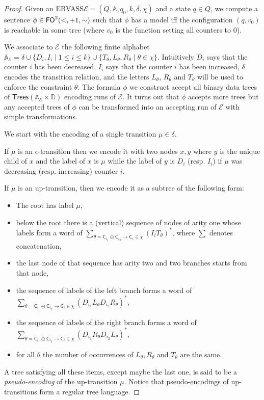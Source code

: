 \documentclass{CSML}
\newcommand\ebvass{\textup{EBVASS}\xspace}
\newcommand\A{\ensuremath{\mathbb{A}}\xspace}
\newcommand\D{\mathbb{D}}
\newcommand\Ea{\mathcal{E}}
\newcommand\merc[3]{\mathsf{C}_{#1}\mathpunct{\circleddash}\mathsf{C}_{#2}\to\mathsf{C}_{#3}}
\newcommand\Trees{\mathsf{Trees}}
\begin{document}
\begin{proof}
Given an \ebvass $\Ea=(Q,\A,q_0,k,\delta,\chi)$ and a state $q\in Q$, 
we compute a sentence $\phi \in \mathsf{FO}^2(\mathord{<},\mathord{+}1,\mathord{\sim})$ such that $\phi$ has a model 
iff the configuration $(q,v_0)$ is reachable in some tree
(where $v_0$ is the function setting all counters to $0$).

\noindent
We associate to $\Ea$ the following finite alphabet
$\A_\Ea = \delta \cup\{ D_i, I_i \mid 1\leq i \leq k\} 
               \cup \{ T_\theta, L_\theta, R_\theta \mid \theta \in \chi \}$. 
Intuitively $D_i$ says that the counter
$i$ has been decreased, $I_i$ says that the counter $i$ has been increased,
$\delta$ encodes the transition relation, and the letters $L_\theta$, $R_\theta$ and $T_\theta$ will be used to enforce 
the constraint $\theta$. 
The formula $\phi$ we construct accept all binary data trees 
of $\Trees(\A_\Ea\times \D)$ encoding runs of $\Ea$. It turns out that $\phi$
accepts more trees but any accepted trees of $\phi$ can be transformed into an accepting
run of $\Ea$ with simple transformations.

\noindent
We start with the encoding of a single transition $\mu \in \delta$.

\noindent
If $\mu$ is an $\epsilon$-transition then we encode it with two nodes
$x,y$ where $y$ is the unique child of $x$ and the label of $x$ is $\mu$ while
the label of $y$ is $D_i$ (resp. $I_i$) 
if $\mu$ was decreasing (resp. increasing) counter $i$.

\noindent
If $\mu$ is an up-transition, then we encode
it as a subtree of the following form:
\begin{itemize}
\item The root has label $\mu$,
\item below the root there is a (vertical) sequence of nodes of arity one whose 
  labels form a word of
  $\displaystyle\sum_{\theta = \merc{i_1}{i_2}{i}\in\chi} (I_iT_\theta)^*$, 
  where $\sum$ denotes concatenation,
\item the last node of that sequence has arity two and two branches starts from that node,
\item the sequence of labels of the left branch forms a word of
$\displaystyle\sum_{\theta=\merc{i_1}{i_2}{i}\in\chi} (D_{i_1}L_\theta D_{i_2}R_\theta)^*$,
\item the sequence of labels of the right branch forms a word of
$\displaystyle\sum_{\theta=\merc{i_1}{i_2}{i}\in\chi} (D_{i_1}R_\theta D_{i_2}L_\theta)^*$,
\item for all $\theta$ the number of occurrences of $L_\theta, R_\theta$ and
  $T_\theta$ are the same.
\end{itemize}
A tree satisfying all these items, except maybe the last one, is said to be a \emph{pseudo-encoding} of the up-transition $\mu$. 
Notice that pseudo-encodings of up-transitions form a regular tree language.


\end{proof}
\end{document}
